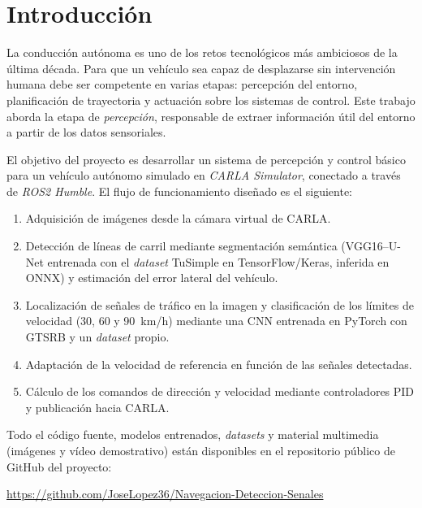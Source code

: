 \documentclass[12pt, a4paper]{article}
\begin{document}
\newpage

\section{Introducción}

La conducción autónoma es uno de los retos tecnológicos más ambiciosos de la última década. Para que un vehículo sea capaz de desplazarse sin intervención humana debe ser competente en varias etapas: percepción del entorno, planificación de trayectoria y actuación sobre los sistemas de control. Este trabajo aborda la etapa de \textit{percepción}, responsable de extraer información útil del entorno a partir de los datos sensoriales.

El objetivo del proyecto es desarrollar un sistema de percepción y control básico para un vehículo autónomo simulado en \textit{CARLA Simulator}, conectado a través de \textit{ROS2 Humble}. El flujo de funcionamiento diseñado es el siguiente:

\begin{enumerate}
    \item Adquisición de imágenes desde la cámara virtual de CARLA.
    \item Detección de líneas de carril mediante segmentación semántica (VGG16--U-Net entrenada con el \textit{dataset} TuSimple en TensorFlow/Keras, inferida en ONNX) y estimación del error lateral del vehículo.
    \item Localización de señales de tráfico en la imagen y clasificación de los límites de velocidad (30, 60 y 90~km/h) mediante una CNN entrenada en PyTorch con GTSRB y un \textit{dataset} propio.
    \item Adaptación de la velocidad de referencia en función de las señales detectadas.
    \item Cálculo de los comandos de dirección y velocidad mediante controladores PID y publicación hacia CARLA.
\end{enumerate}

Todo el código fuente, modelos entrenados, \textit{datasets} y material multimedia (imágenes y vídeo demostrativo) están disponibles en el repositorio público de GitHub del proyecto:
\begin{center}
    \url{https://github.com/JoseLopez36/Navegacion-Deteccion-Senales}
\end{center}
\end{document}
